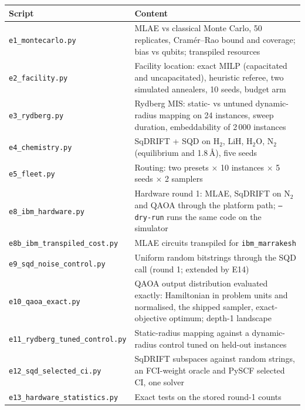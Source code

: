 \documentclass[11pt,a4paper]{article}
\begin{document}
\begin{center}\small
\begin{tabular}{lp{9.6cm}}
\toprule
Script & Content \\
\midrule
\texttt{e1\_montecarlo.py} & MLAE vs classical Monte Carlo, 50 replicates, Cram\'er--Rao bound and coverage; bias vs qubits; transpiled resources \\
\texttt{e2\_facility.py} & Facility location: exact MILP (capacitated and uncapacitated), heuristic referee, two simulated annealers, 10 seeds, budget arm \\
\texttt{e3\_rydberg.py} & Rydberg MIS: static- vs untuned dynamic-radius mapping on 24 instances, sweep duration, embeddability of 2\,000 instances \\
\texttt{e4\_chemistry.py} & SqDRIFT + SQD on H$_2$, LiH, H$_2$O, N$_2$ (equilibrium and 1.8\,\AA), five seeds \\
\texttt{e5\_fleet.py} & Routing: two presets $\times$ 10 instances $\times$ 5 seeds $\times$ 2 samplers \\
\texttt{e8\_ibm\_hardware.py} & Hardware round 1: MLAE, SqDRIFT on N$_2$ and QAOA through the platform path; \texttt{--dry-run} runs the same code on the simulator \\
\texttt{e8b\_ibm\_transpiled\_cost.py} & MLAE circuits transpiled for \texttt{ibm\_marrakesh} \\
\texttt{e9\_sqd\_noise\_control.py} & Uniform random bitstrings through the SQD call (round 1; extended by E14) \\
\texttt{e10\_qaoa\_exact.py} & QAOA output distribution evaluated exactly: Hamiltonian in problem units and normalised, the shipped sampler, exact-objective optimum; depth-1 landscape \\
\texttt{e11\_rydberg\_tuned\_control.py} & Static-radius mapping against a dynamic-radius control tuned on held-out instances \\
\texttt{e12\_sqd\_selected\_ci.py} & SqDRIFT subspaces against random strings, an FCI-weight oracle and PySCF selected CI, one solver \\
\texttt{e13\_hardware\_statistics.py} & Exact tests on the stored round-1 counts \\
\bottomrule
\end{tabular}
\end{center}
\end{document}
